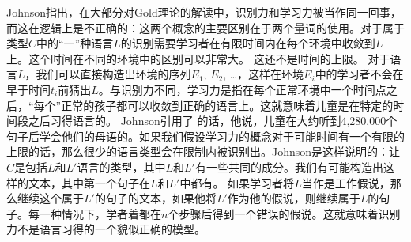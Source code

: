 Johnson指出，在大部分对Gold理论的解读中，识别力和学习力被当作同一回事，而这在逻辑上是不正确的：这两个概念的主要区别在于两个量词的使用。对于属于类型$C$中的“一”种语言$L$的识别需要学习者在有限时间内在每个环境中收敛到$L$上。这个时间在不同的环境中的区别可以非常大。
这还不是时间的上限。
对于语言$L$，我们可以直接构造出环境的序列$E_1$, $E_2$, \ldots{}，这样在环境$E_i$中的学习者不会在早于时间$t_i$前猜出$L$。与识别力不同，学习力是指在每个正常环境中一个时间点之后，“每个”正常的孩子都可以收敛到正确的语言上。这就意味着儿童是在特定的时间段之后习得语言的。
 Johnson引用了 \citet[]{Morgan89a}的话，他说，儿童在大约听到4,280,000个句子后学会他们的母语的。如果我们假设学习力的概念对于可能时间有一个有限的上限的话，那么很少的语言类型会在限制内被识别出。Johnson是这样说明的：让$C$是包括$L$和$L'$语言的类型，其中$L$和$L'$有一些共同的成分。我们有可能构造出这样的文本，其中第一个句子在$L$和$L'$中都有。
如果学习者将$L$当作是工作假说，那么继续这个属于$L'$的句子的文本，如果他将$L'$作为他的假说，则继续属于$L$的句子。每一种情况下，学者着都在$n$个步骤后得到一个错误的假说。这就意味着识别力不是语言习得的一个貌似正确的模型。

